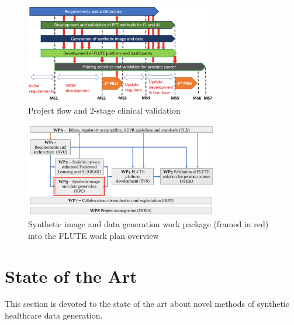 \documentclass[a4paper,12pt]{article}
\begin{document}
\begin{figure}[htb]
    \centering
    \includegraphics[width=0.75\textwidth]{pics/methodology3.png}
    \caption{Project flow and 2-stage clinical validation}
    \label{fig:methodology3}
\end{figure}

\begin{figure}[htb]
    \centering
    \includegraphics[width=0.75\textwidth]{pics/methodology4.png}
    \caption{Synthetic image and data generation work package (framed in red) into the FLUTE work plan overview}
    \label{fig:methodology4}
\end{figure}


\section{State of the Art}

This section is devoted to the state of the art about novel methods of synthetic healthcare data generation. 
\end{document}
